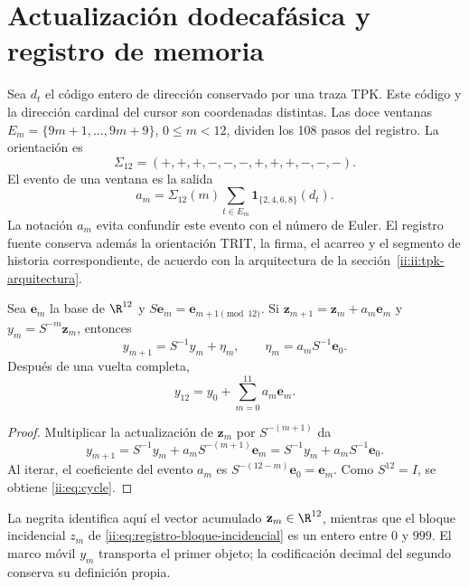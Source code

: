 \section{Actualización dodecafásica y registro de memoria}
\label{ii:sec:eta}
Sea $d_t$ el código entero de dirección conservado por una traza TPK.
Este código y la dirección cardinal del cursor son coordenadas distintas.
Las doce ventanas
$E_m=\{9m+1,\ldots,9m+9\}$, $0\le m<12$, dividen los 108 pasos del registro.
La orientación es
\[
\Sigma_{12}=(+,+,+,-,-,-,+,+,+,-,-,-).
\]
El evento de una ventana es la salida
\begin{equation}
a_m=\Sigma_{12}(m)
\sum_{t\in E_m}\mathbf1_{\{2,4,6,8\}}(d_t).
\label{ii:eq:events}
\end{equation}
La notación $a_m$ evita confundir este evento con el número de Euler.
El registro fuente conserva además la orientación TRIT, la firma,
el acarreo y el segmento de historia correspondiente, de acuerdo con la arquitectura de la sección~\ref{ii:ii:tpk-arquitectura}.

\begin{proposition}
Sea $\mathbf e_m$ la base de $\R^{12}$ y
$S\mathbf e_m=\mathbf e_{m+1\pmod{12}}$. Si
$\mathbf z_{m+1}=\mathbf z_m+a_m\mathbf e_m$ y $y_m=S^{-m}\mathbf z_m$, entonces
\begin{equation}
y_{m+1}=S^{-1}y_m+\eta_m,
\qquad
\eta_m=a_mS^{-1}\mathbf e_0.
\label{ii:eq:eta}
\end{equation}
Después de una vuelta completa,
\begin{equation}
y_{12}=y_0+\sum_{m=0}^{11}a_m\mathbf e_m.
\label{ii:eq:cycle}
\end{equation}
\end{proposition}
\begin{proof}
Multiplicar la actualización de $\mathbf z_m$ por $S^{-(m+1)}$ da
\[
y_{m+1}=S^{-1}y_m+a_mS^{-(m+1)}\mathbf e_m
=S^{-1}y_m+a_mS^{-1}\mathbf e_0.
\]
Al iterar, el coeficiente del evento $a_m$ es
$S^{-(12-m)}\mathbf e_0=\mathbf e_m$. Como $S^{12}=I$,
se obtiene \eqref{ii:eq:cycle}.
\end{proof}

La negrita identifica aquí el vector acumulado
\(\mathbf z_m\in\R^{12}\), mientras que el bloque incidencial
\(z_m\) de \eqref{ii:eq:registro-bloque-incidencial} es un entero entre
\(0\) y \(999\). El marco móvil \(y_m\) transporta el primer objeto;
la codificación decimal del segundo conserva su definición propia.

